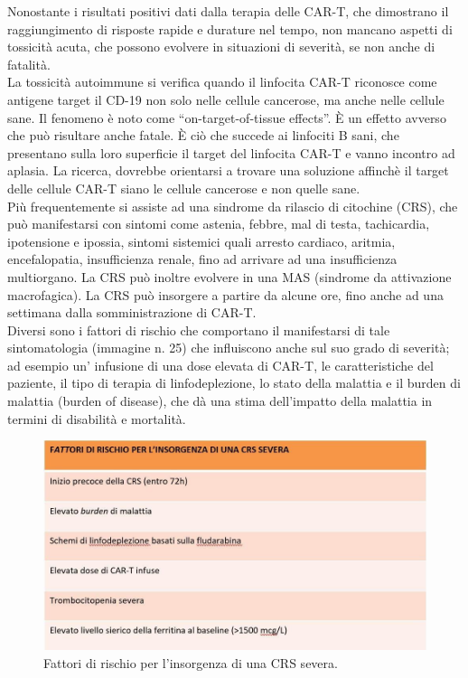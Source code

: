 Nonostante i risultati positivi dati dalla terapia delle CAR-T, che dimostrano il raggiungimento di risposte rapide e 
durature nel tempo, non mancano aspetti di tossicità acuta, che possono evolvere in situazioni di severità, se non 
anche di fatalità\cite{EMATOCART}.\\
La tossicità autoimmune si verifica quando il linfocita CAR-T riconosce come antigene target il CD-19 non solo nelle 
cellule cancerose, ma anche nelle cellule sane.
Il fenomeno è noto come “on-target-of-tissue effects”. È un effetto avverso che può risultare anche fatale.
È ciò che succede ai linfociti B sani, che presentano sulla loro superficie il target del linfocita CAR-T e vanno 
incontro ad aplasia. La ricerca, dovrebbe orientarsi a trovare una soluzione affinchè il target delle cellule CAR-T 
siano le cellule cancerose e non quelle sane\cite{Frontiers}.\\

Più frequentemente si assiste ad una sindrome da rilascio di citochine (CRS), che può manifestarsi con sintomi come 
astenia, febbre, mal di testa, tachicardia, ipotensione e ipossia, sintomi sistemici quali arresto cardiaco, aritmia, 
encefalopatia, insufficienza renale, fino ad arrivare ad una insufficienza multiorgano. La CRS può inoltre evolvere 
in una MAS (sindrome da attivazione macrofagica). 
La CRS può insorgere a partire da alcune ore, fino anche ad una settimana dalla somministrazione di CAR-T.\\
Diversi sono i fattori di rischio che comportano il manifestarsi di tale sintomatologia (immagine n. 25) che 
influiscono anche sul suo grado di severità; ad esempio un’ infusione di una dose elevata di CAR-T, le caratteristiche 
del paziente, il tipo di terapia di linfodeplezione, lo stato della malattia e il  burden di malattia 
(burden of disease), che dà una stima dell’impatto della malattia in termini di disabilità e mortalità\cite{EMATOCART}.\\

\begin{figure}[H]
    \begin{center}
    \includegraphics[width=0.8\columnwidth]{img/rischio CRS.jpeg}
    \end{center}
    \caption[Fattori di rischio per l’insorgenza di una CRS severa. ]{Fattori di rischio per l’insorgenza di una CRS severa. 
    \cite{img25}}

\end{figure}

